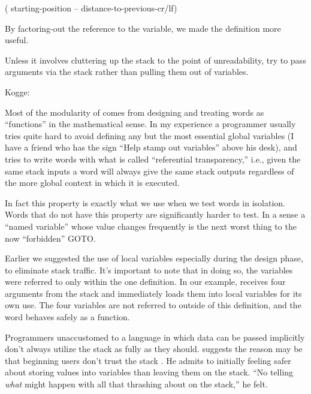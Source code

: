 \begin{Code}
( starting-position -- distance-to-previous-cr/lf)
\end{Code}
By factoring-out the reference to the variable, we made the definition
more useful.

\begin{tip}
Unless it involves cluttering up the stack to the point of unreadability,
try to pass arguments via the stack rather than pulling them out of
variables.
\end{tip}

\begin{interview}
Kogge:
\begin{tfquot}
Most of the modularity of \Forth{} comes from designing and treating
\Forth{} words as ``functions'' in the mathematical sense. In my
experience a \Forth{} programmer usually tries quite hard to avoid
defining any but the most essential global variables (I have a friend who
has the sign ``Help stamp out variables'' above his desk), and tries to
write words with what is called ``referential transparency,'' i.e., given
the same stack inputs a word will always give the same stack outputs
regardless of the more global context in which it is executed.

In fact this property is exactly what we use when we test words in
isolation.  Words that do not have this property are significantly harder
to test. In a sense a ``named variable'' whose value changes frequently is
the next worst thing to the now ``forbidden'' GOTO.
\end{tfquot}
\end{interview}


Earlier we suggested the use of local variables especially during the
design phase, to eliminate stack traffic. It's important to note that in
doing so, the variables were referred to only within the one definition.
In our example, \forth{[BOX]} receives four arguments from the stack and
immediately loads them into local variables for its own use. The four
variables are not referred to outside of this definition, and the word
behaves safely as a function.

Programmers unaccustomed to a language in which data can be passed
implicitly don't always utilize the stack as fully as they should.
suggests the reason may be that beginning \Forth{} users
don't trust the stack \cite{ham83}. He admits to initially feeling
safer about storing values into variables than leaving them on the
stack. ``No telling \emph{what} might happen with all that thrashing
about on the stack,'' he felt.

